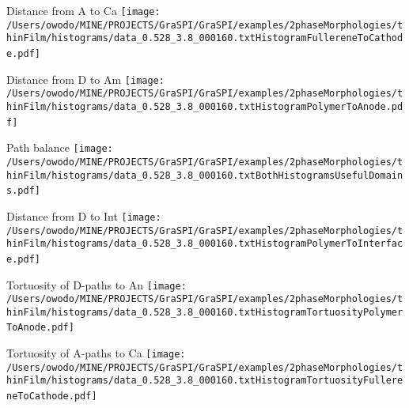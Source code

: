 \documentclass{article}
\begin{document}
\parbox{0.60\textwidth}{
\parbox{0.3\textwidth}{\centering Distance from A to Ca \newline
\texttt{[image: /Users/owodo/MINE/PROJECTS/GraSPI/GraSPI/examples/2phaseMorphologies/thinFilm/histograms/data\_0.528\_3.8\_000160.txtHistogramFullereneToCathode.pdf]} \ ~ \ } 
\parbox{0.3\textwidth}{\centering Distance from D to Am \newline
\texttt{[image: /Users/owodo/MINE/PROJECTS/GraSPI/GraSPI/examples/2phaseMorphologies/thinFilm/histograms/data\_0.528\_3.8\_000160.txtHistogramPolymerToAnode.pdf]} \ ~ \ }
\parbox{0.3\textwidth}{\centering Path balance \newline 
\texttt{[image: /Users/owodo/MINE/PROJECTS/GraSPI/GraSPI/examples/2phaseMorphologies/thinFilm/histograms/data\_0.528\_3.8\_000160.txtBothHistogramsUsefulDomains.pdf]} \ ~ \ }
\parbox{0.3\textwidth}{\centering Distance from D to Int \newline 
\texttt{[image: /Users/owodo/MINE/PROJECTS/GraSPI/GraSPI/examples/2phaseMorphologies/thinFilm/histograms/data\_0.528\_3.8\_000160.txtHistogramPolymerToInterface.pdf]} \ ~ \ }
\parbox{0.3\textwidth}{\centering Tortuosity of D-paths to An  \newline
\texttt{[image: /Users/owodo/MINE/PROJECTS/GraSPI/GraSPI/examples/2phaseMorphologies/thinFilm/histograms/data\_0.528\_3.8\_000160.txtHistogramTortuosityPolymerToAnode.pdf]} \ ~ \ }
\parbox{0.3\textwidth}{\centering Tortuosity of A-paths to Ca \newline
\texttt{[image: /Users/owodo/MINE/PROJECTS/GraSPI/GraSPI/examples/2phaseMorphologies/thinFilm/histograms/data\_0.528\_3.8\_000160.txtHistogramTortuosityFullereneToCathode.pdf]} \ ~ \ }
}
\newpage
\end{document}
